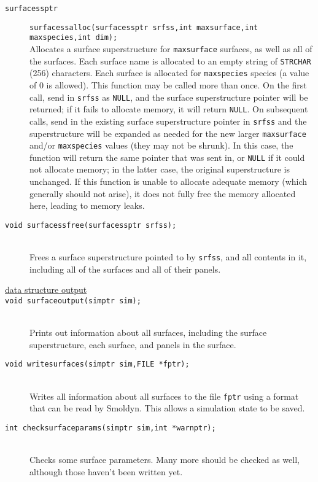 \documentclass {book}
\begin{document}
\begin{description}
\item[\texttt{surfacessptr}]
\texttt{surfacessalloc(surfacessptr srfss,int maxsurface,int maxspecies,int dim);}
\hfill \\
Allocates a surface superstructure for \texttt{maxsurface} surfaces, as well as all of the surfaces. Each surface name is allocated to an empty string of \texttt{STRCHAR} (256) characters. Each surface is allocated for \texttt{maxspecies} species (a value of 0 is allowed). This function may be called more than once. On the first call, send in \texttt{srfss} as \texttt{NULL}, and the surface superstructure pointer will be returned; if it fails to allocate memory, it will return \texttt{NULL}. On subsequent calls, send in the existing surface superstructure pointer in \texttt{srfss} and the superstructure will be expanded as needed for the new larger \texttt{maxsurface} and/or \texttt{maxspecies} values (they may not be shrunk). In this case, the function will return the same pointer that was sent in, or \texttt{NULL} if it could not allocate memory; in the latter case, the original superstructure is unchanged. If this function is unable to allocate adequate memory (which generally should not arise), it does not fully free the memory allocated here, leading to memory leaks.

\item[\texttt{void surfacessfree(surfacessptr srfss);}]
\hfill \\
Frees a surface superstructure pointed to by \texttt{srfss}, and all contents in it, including all of the surfaces and all of their panels.

\item[\underline{data structure output}]

\item[\texttt{void surfaceoutput(simptr sim);}]
\hfill \\
Prints out information about all surfaces, including the surface superstructure, each surface, and panels in the surface.

\item[\texttt{void writesurfaces(simptr sim,FILE *fptr);}]
\hfill \\
Writes all information about all surfaces to the file \texttt{fptr} using a format that can be read by Smoldyn. This allows a simulation state to be saved.

\item[\texttt{int checksurfaceparams(simptr sim,int *warnptr);}]
\hfill \\
Checks some surface parameters. Many more should be checked as well, although those haven't been written yet.


\end{description}
\end{document}
